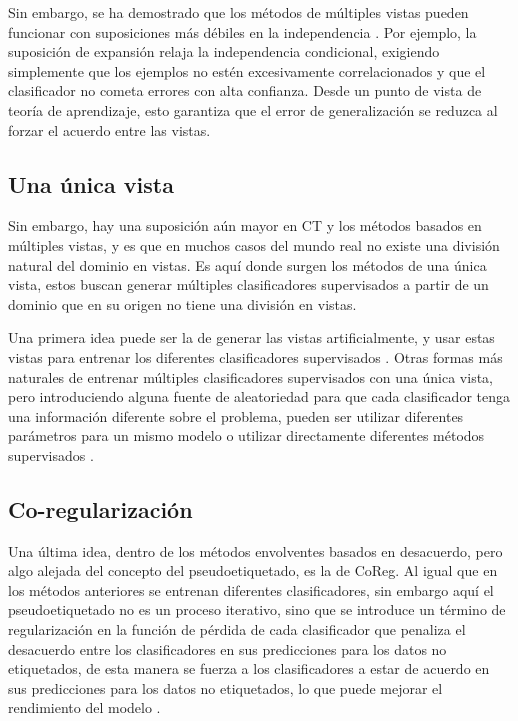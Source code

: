 Sin embargo, se ha demostrado que los métodos de múltiples vistas pueden funcionar con suposiciones más débiles en la independencia \cite{abney2002bootstrapping}. Por ejemplo, la suposición de expansión \cite{balcan2004co} relaja la independencia condicional, exigiendo simplemente que los ejemplos no estén excesivamente correlacionados y que el clasificador no cometa errores con alta confianza. Desde un punto de vista de teoría de aprendizaje, esto garantiza que el error de generalización se reduzca al forzar el acuerdo entre las vistas.

\subsection{Una única vista}

Sin embargo, hay una suposición aún mayor en \gls{CT} y los métodos basados en múltiples vistas, y es que en muchos casos del mundo real no existe una división natural del dominio en vistas. Es aquí donde surgen los métodos de una única vista, estos buscan generar múltiples clasificadores supervisados a partir de un dominio que en su origen no tiene una división en vistas.

Una primera idea puede ser la de generar las vistas artificialmente, y usar estas vistas para entrenar los diferentes clasificadores supervisados \cite{wang2008random}. Otras formas más naturales de entrenar múltiples clasificadores supervisados con una única vista, pero introduciendo alguna fuente de aleatoriedad para que cada clasificador tenga una información diferente sobre el problema, pueden ser utilizar diferentes parámetros para un mismo modelo \cite{wang2007analyzing} o utilizar directamente diferentes métodos supervisados \cite{Goldman2000EnhancingSL}.

\subsection{Co-regularización}

Una última idea, dentro de los métodos envolventes basados en desacuerdo, pero algo alejada del concepto del pseudoetiquetado, es la de \gls{CoReg}. Al igual que en los métodos anteriores se entrenan diferentes clasificadores, sin embargo aquí el pseudoetiquetado no es un proceso iterativo, sino que se introduce un término de regularización en la función de pérdida de cada clasificador que penaliza el desacuerdo entre los clasificadores en sus predicciones para los datos no etiquetados, de esta manera se fuerza a los clasificadores a estar de acuerdo en sus predicciones para los datos no etiquetados, lo que puede mejorar el rendimiento del modelo \cite{sindhwani2008rkhs}.

